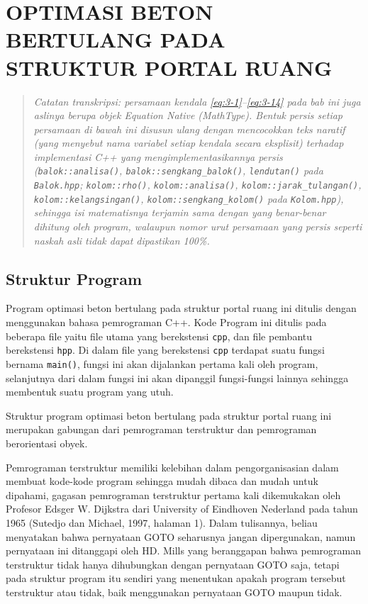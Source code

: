 \chapter{OPTIMASI BETON BERTULANG PADA STRUKTUR PORTAL RUANG}
\label{bab:optimasi}

\begin{quote}
\small\itshape
Catatan transkripsi: persamaan kendala \eqref{eq:3-1}--\eqref{eq:3-14} pada
bab ini juga aslinya berupa objek \textit{Equation Native} (MathType).
Bentuk persis setiap persamaan di bawah ini disusun ulang dengan mencocokkan
teks naratif (yang menyebut nama variabel setiap kendala secara eksplisit)
terhadap implementasi C++ yang mengimplementasikannya persis
(\texttt{balok::analisa()}, \texttt{balok::sengkang\_balok()},
\texttt{lendutan()} pada \texttt{Balok.hpp}; \texttt{kolom::rho()},
\texttt{kolom::analisa()}, \texttt{kolom::jarak\_tulangan()},
\texttt{kolom::kelangsingan()}, \texttt{kolom::sengkang\_kolom()} pada
\texttt{Kolom.hpp}), sehingga isi matematisnya terjamin sama dengan yang
benar-benar dihitung oleh program, walaupun nomor urut persamaan yang
persis seperti naskah asli tidak dapat dipastikan 100\%.
\end{quote}

\section{Struktur Program}

Program optimasi beton bertulang pada struktur portal ruang ini ditulis
dengan menggunakan bahasa pemrograman C++. Kode Program ini ditulis pada
beberapa file yaitu file utama yang berekstensi \texttt{cpp}, dan file
pembantu berekstensi \texttt{hpp}. Di dalam file yang berekstensi
\texttt{cpp} terdapat suatu fungsi bernama \texttt{main()}, fungsi ini akan
dijalankan pertama kali oleh program, selanjutnya dari dalam fungsi ini
akan dipanggil fungsi-fungsi lainnya sehingga membentuk suatu program yang
utuh.

Struktur program optimasi beton bertulang pada struktur portal ruang ini
merupakan gabungan dari pemrograman terstruktur dan pemrograman
berorientasi obyek.

Pemrograman terstruktur memiliki kelebihan dalam pengorganisasian dalam
membuat kode-kode program sehingga mudah dibaca dan mudah untuk dipahami,
gagasan pemrograman terstruktur pertama kali dikemukakan oleh Profesor
Edsger W. Dijkstra dari University of Eindhoven Nederland pada tahun 1965
(Sutedjo dan Michael, 1997, halaman 1). Dalam tulisannya, beliau menyatakan
bahwa pernyataan GOTO seharusnya jangan dipergunakan, namun pernyataan ini
ditanggapi oleh HD. Mills yang beranggapan bahwa pemrograman terstruktur
tidak hanya dihubungkan dengan pernyataan GOTO saja, tetapi pada struktur
program itu sendiri yang menentukan apakah program tersebut terstruktur
atau tidak, baik menggunakan pernyataan GOTO maupun tidak.

